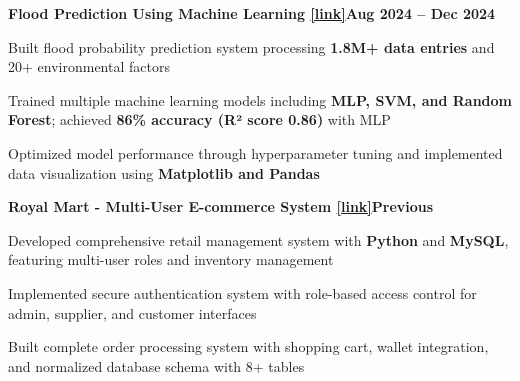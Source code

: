 \documentclass[letterpaper,10pt]{article}
\newcommand{\heading}[2]{
  \hspace{10pt}#1\hfill#2\\
}
\newcommand{\headingBf}[2]{
  \heading{\textbf{#1}}{\textbf{#2}}
}
\newenvironment{resume_list}{
  \vspace{-7pt}
  \begin{itemize}[itemsep=-2px, parsep=1pt, leftmargin=30pt]
}{
  \end{itemize}
}
\begin{document}
  \headingBf{Flood Prediction Using Machine Learning \href{https://github.com/sng-aditya/Flood_Probability_Prediction}{[link]}}{Aug 2024 -- Dec 2024}
  \begin{resume_list}
    \item Built flood probability prediction system processing \textbf{1.8M+ data entries} and 20+ environmental factors
    \item Trained multiple machine learning models including \textbf{MLP, SVM, and Random Forest}; achieved \textbf{86\% accuracy (R² score 0.86)} with MLP
    \item Optimized model performance through hyperparameter tuning and implemented data visualization using \textbf{Matplotlib and Pandas}
  \end{resume_list}


  \headingBf{Royal Mart - Multi-User E-commerce System \href{https://github.com/sng-aditya/royal-mart}{[link]}}{Previous}
  \begin{resume_list}
    \item Developed comprehensive retail management system with \textbf{Python} and \textbf{MySQL}, featuring multi-user roles and inventory management
    \item Implemented secure authentication system with role-based access control for admin, supplier, and customer interfaces
    \item Built complete order processing system with shopping cart, wallet integration, and normalized database schema with 8+ tables
  \end{resume_list}
\end{document}
